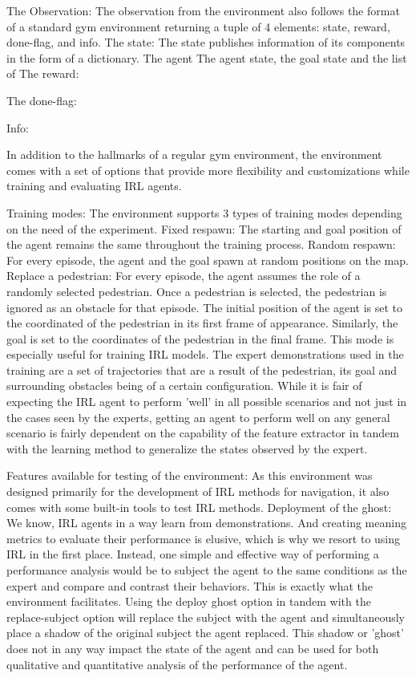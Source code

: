 The Observation:
The observation from the environment also follows the format of a standard gym environment returning a tuple of 4 elements: state, reward, done-flag, and info.
The state:
The state publishes information of its components in the form of a dictionary. The agent 
The agent state, the goal state and the list of 
The reward:

The done-flag:

Info:

In addition to the hallmarks of a regular gym environment, the environment comes with a set of options that provide more flexibility and customizations while training and evaluating IRL agents.

Training modes:
The environment supports 3 types of training modes depending on the need of the experiment. 
Fixed respawn: The starting and goal position of the agent remains the same throughout the training process.
Random respawn: For every episode, the agent and the goal spawn at random positions on the map. 
Replace a pedestrian: For every episode, the agent assumes the role of a randomly selected pedestrian. Once a pedestrian is selected, the pedestrian is ignored as an obstacle for that episode. The initial position of the agent is set to the coordinated of the pedestrian in its first frame of appearance. Similarly, the goal is set to the coordinates of the pedestrian in the final frame.
This mode is especially useful for training IRL models. The expert demonstrations used in the training are a set of trajectories that are a result of the pedestrian, its goal and surrounding obstacles being of a certain configuration. While it is fair of expecting the IRL agent to perform 'well' in all possible scenarios and not just in the cases seen by the experts, getting an agent to perform well on any general scenario is fairly dependent on the capability of the feature extractor in tandem with the learning method to generalize the states observed by the expert.  

Features available for testing of the environment:
As this environment was designed primarily for the development of IRL methods for navigation, it also comes with some built-in tools to test IRL methods.
Deployment of the ghost:
We know, IRL agents in a way learn from demonstrations. And creating meaning metrics to evaluate their performance is elusive, which is why we resort to using IRL in the first place. Instead, one simple and effective way of performing a performance analysis would be to subject the agent to the same conditions as the expert and compare and contrast their behaviors. This is exactly what the environment facilitates. Using the deploy ghost option in tandem with the replace-subject option will replace the subject with the agent and simultaneously place a shadow of the original subject the agent replaced. This shadow or 'ghost' does not in any way impact the state of the agent and can be used for both qualitative and quantitative analysis of the performance of the agent. 

